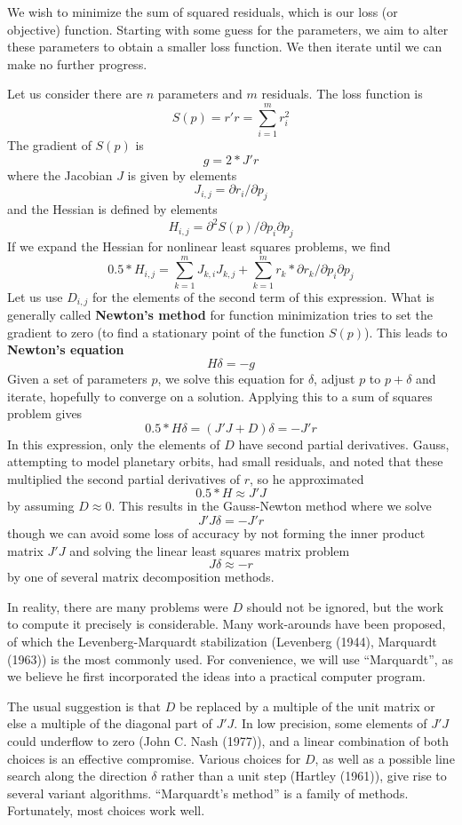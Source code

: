 We wish to minimize the sum of squared residuals, which is our loss (or objective) function.
Starting with some guess for the parameters, we aim to alter these parameters to obtain a smaller
loss function. We then iterate until we can make no further progress.

Let us consider there are \(n\) parameters and \(m\) residuals.
The loss function is
\[ S(p) = r' r = \sum_{i=1}^m { r_i^2 }\]
The gradient of \(S(p)\) is
\[ g = 2 * J' r\]
where the Jacobian \(J\) is given by elements
\[ J_{i,j} = \partial r_i / \partial p_j \]
and the Hessian is defined by elements
\[ H_{i,j} = \partial ^2 S(p) / {\partial p_i \partial p_j} \]
If we expand the Hessian for nonlinear least squares problems, we find
\[  0.5 * H_{i,j} = \sum_{k = 1}^m{ J_{k,i} J_{k,j}}  + \sum_{k = 1}^m {r_k * \partial{r_k}/{\partial p_i \partial p_j}}\]
Let us use \(D_{i,j}\) for the elements of the second term of this expression.
What is generally called \textbf{Newton's method} for function minimization tries
to set the gradient to zero (to find a stationary point of the function \(S(p)\)).
This leads to \textbf{Newton's equation}
\[ H \delta = -g \]
Given a set of parameters \(p\), we solve this equation for \(\delta\), adjust \(p\)
to \(p + \delta\) and iterate, hopefully to converge on a solution.
Applying this to a sum of squares problem gives
\[ 0.5 * H \delta = (J'J + D) \delta = - J' r\]
In this expression, only the elements of \(D\) have second partial derivatives.
Gauss, attempting to model planetary orbits, had small residuals, and noted
that these multiplied the second partial derivatives of \(r\), so he approximated
\[ 0.5 * H \approx J' J\]
by assuming \(D \approx 0\). This results in the Gauss-Newton method where we
solve
\[ J' J \delta = - J' r\]
though we can avoid some loss of accuracy by not forming the inner product matrix
\(J' J\) and solving the linear least squares matrix problem
\[ J \delta \approx -r \]
by one of several matrix decomposition methods.

In reality, there are many problems were \(D\) should not be ignored, but the work
to compute it precisely is considerable. Many work-arounds have been
proposed, of which the Levenberg-Marquardt stabilization
(Levenberg (1944), Marquardt (1963)) is
the most commonly used. For convenience, we will use ``Marquardt'', as we believe he
first incorporated the ideas into a practical computer program.

The usual suggestion is that \(D\) be replaced by a multiple of the unit matrix or else
a multiple of the diagonal part of \(J' J\). In low precision, some elements of
\(J' J\) could underflow to zero (John C. Nash (1977)), and a linear combination of both
choices is an effective compromise. Various choices for
\(D\), as well as a possible line search along the
direction \(\delta\) rather than a unit step (Hartley (1961)),
give rise to several variant
algorithms. ``Marquardt's method'' is a family of methods. Fortunately, most choices
work well.

